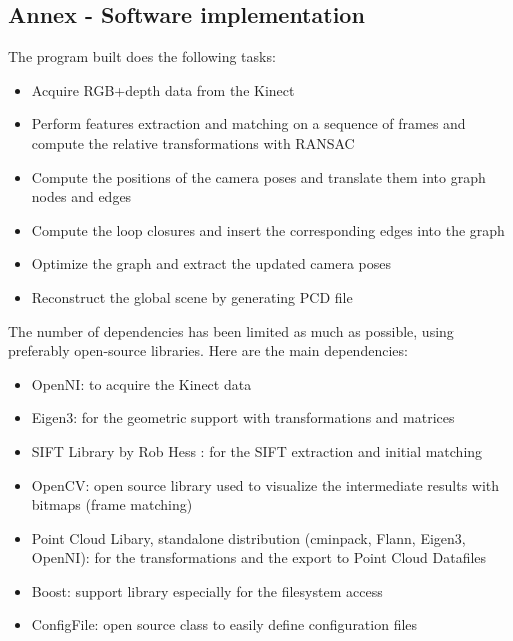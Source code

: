\begin{appendices}
\chapter{Annex - Software implementation}

The program built does the following tasks:
\begin{itemize}
\item Acquire RGB+depth data from the Kinect
\item Perform features extraction and matching on a sequence of frames and compute the relative transformations with RANSAC
\item Compute the positions of the camera poses and translate them into graph nodes and edges
\item Compute the loop closures and insert the corresponding edges into the graph
\item Optimize the graph and extract the updated camera poses
\item Reconstruct the global scene by generating PCD file
\end{itemize}

The number of dependencies has been limited as much as possible, using preferably open-source libraries.
Here are the main dependencies:
\begin{itemize}
\item OpenNI: to acquire the Kinect data
\item Eigen3: for the geometric support with transformations and matrices
\item SIFT Library by Rob Hess \cite{hesssift}: for the SIFT extraction and initial matching
\item OpenCV: open source library used to visualize the intermediate results with bitmaps (frame matching)
\item Point Cloud Libary, standalone distribution (cminpack, Flann, Eigen3, OpenNI): for the transformations and the export to Point Cloud Datafiles
\item Boost: support library especially for the filesystem access
\item ConfigFile: open source class to easily define configuration files
\end{itemize}

\end{appendices}


